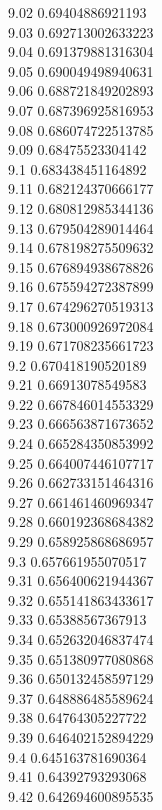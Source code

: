 {9.02	0.69404886921193\\
9.03	0.692713002633223\\
9.04	0.691379881316304\\
9.05	0.690049498940631\\
9.06	0.688721849202893\\
9.07	0.687396925816953\\
9.08	0.686074722513785\\
9.09	0.68475523304142\\
9.1	0.683438451164892\\
9.11	0.682124370666177\\
9.12	0.680812985344136\\
9.13	0.679504289014464\\
9.14	0.678198275509632\\
9.15	0.676894938678826\\
9.16	0.675594272387899\\
9.17	0.674296270519313\\
9.18	0.673000926972084\\
9.19	0.671708235661723\\
9.2	0.670418190520189\\
9.21	0.66913078549583\\
9.22	0.667846014553329\\
9.23	0.666563871673652\\
9.24	0.665284350853992\\
9.25	0.664007446107717\\
9.26	0.662733151464316\\
9.27	0.661461460969347\\
9.28	0.660192368684382\\
9.29	0.658925868686957\\
9.3	0.657661955070517\\
9.31	0.656400621944367\\
9.32	0.655141863433617\\
9.33	0.65388567367913\\
9.34	0.652632046837474\\
9.35	0.651380977080868\\
9.36	0.650132458597129\\
9.37	0.648886485589624\\
9.38	0.64764305227722\\
9.39	0.646402152894229\\
9.4	0.645163781690364\\
9.41	0.64392793293068\\
9.42	0.642694600895535\\
}
